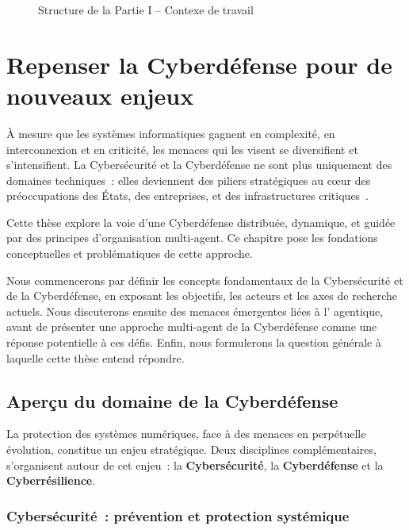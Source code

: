 \begin{figure}[h!]
  \centering
  \resizebox{\textwidth}{!}{%
    
  }
  \caption{Structure de la Partie I -- Contexe de travail}
  \label{fig:organisation_manuscrit_partie_1}
\end{figure}

\clearpage
\thispagestyle{empty}
\null
\newpage

\chapter{Repenser la Cyberdéfense pour de nouveaux enjeux}

\noindent
À mesure que les systèmes informatiques gagnent en complexité, en interconnexion et en criticité, les menaces qui les visent se diversifient et s'intensifient. La Cybersécurité et la Cyberdéfense ne sont plus uniquement des domaines techniques~: elles deviennent des piliers stratégiques au cœur des préoccupations des États, des entreprises, et des infrastructures critiques~\cite{ObiohaVal2025}.

Cette thèse explore la voie d'une Cyberdéfense distribuée, dynamique, et guidée par des principes d'organisation multi-agent. Ce chapitre pose les fondations conceptuelles et problématiques de cette approche.

Nous commencerons par définir les concepts fondamentaux de la Cybersécurité et de la Cyberdéfense, en exposant les objectifs, les acteurs et les axes de recherche actuels. Nous discuterons ensuite des menaces émergentes liées à l' agentique, avant de présenter une approche multi-agent de la Cyberdéfense comme une réponse potentielle à ces défis. Enfin, nous formulerons la question générale à laquelle cette thèse entend répondre.

\section{Aperçu du domaine de la Cyberdéfense}\label{sec:cyberdef-panorama}

La protection des systèmes numériques, face à des menaces en perpétuelle évolution, constitue un enjeu stratégique. Deux disciplines complémentaires, s'organisent autour de cet enjeu~: la \textbf{Cybersécurité}, la \textbf{Cyberdéfense} et la \textbf{Cyberrésilience}.

\subsection*{Cybersécurité~: prévention et protection systémique}

